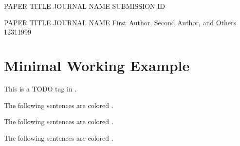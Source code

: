 \documentclass{article}
\begin{document}
\begin{anonymous_cover_letter}
    {PAPER TITLE}   %
    {JOURNAL NAME}  %
    {SUBMISSION ID}

\end{anonymous_cover_letter}

\begin{cover_letter}
    {PAPER TITLE}   %
    {JOURNAL NAME}  %
    {First Author, Second Author, and Others}
    {12}{31}{1999}  %

\end{cover_letter}

\section{Minimal Working Example}

\todo{} This is a TODO tag in \todocolor{}. \todotext{\lipsum[1][1]}

The following sentences are colored \fixgrammarcolor{}.
\fixgrammar{\lipsum[1][1-5]}

The following sentences are colored \revisioncolor{}.
\revision{\lipsum[1][1-5]}

The following sentences are colored \additioncolor{}.
\addition{\lipsum[1][1-5]}


\begin{reviewer_comment}
\lipsum[1][1-5]
\end{reviewer_comment}

\begin{author_response}
\lipsum[1][6-10]
\end{author_response}

\begin{reviewer_comment}
\lipsum[2][1-5]
\end{reviewer_comment}

\begin{author_response}
\lipsum[2][6-10]
\end{author_response}
\end{document}
